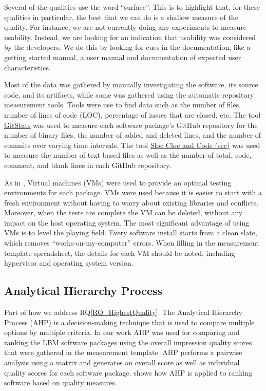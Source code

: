 \documentclass[final, 3p, times, authoryear]{elsarticle}
\newcommand{\rqref}[1]{RQ\ref{#1}}
\begin{document}
Several of the qualities use the word ``surface''.  This is to highlight that,
for these qualities in particular, the best that we can do is a shallow measure
of the quality.  For instance, we are not currently doing any experiments to
measure usability.  Instead, we are looking for an indication that usability was
considered by the developers.  We do this by looking for cues in the
documentation, like a getting started manual, a user manual and documentation of
expected user characteristics.

Most of the data was gathered by manually investigating the software, its source
code, and its artifacts, while some was gathered using the automatic repository
measurement tools.  Tools were use to find data such as the number of files,
number of lines of code (LOC), percentage of issues that are closed, etc. The
tool \href{https://github.com/tomgi/git_stats}{GitStats} was used to measure
each software package's GitHub repository for the number of binary files, the
number of added and deleted lines, and the number of commits over varying time
intervals. The tool \href{https://github.com/boyter/scc}{Sloc Cloc and Code
(scc)} was used to measure the number of text based files as well as the number
of total, code, comment, and blank lines in each GitHub repository.

As in \citet{SmithEtAl2016}, Virtual machines (VMs) were used to provide an
optimal testing environments for each package. VMs were used because it is
easier to start with a fresh environment without having to worry about existing
libraries and conflicts. Moreover, when the tests are complete the VM can be
deleted, without any impact on the host operating system. The most significant
advantage of using VMs is to level the playing field. Every software install
starts from a clean slate, which removes ``works-on-my-computer'' errors. When
filling in the measurement template spreadsheet, the details for each VM
should be noted, including hypervisor and operating system version.

\subsection{Analytical Hierarchy Process} \label{AHP}

Part of how we address \rqref{RQ_HighestQuality}.  The Analytical Hierarchy
Process (AHP) is a decision-making technique that is used to compare multiple
options by multiple criteria. In our work AHP was used for comparing and ranking
the LBM software packages using the overall impression quality scores that were
gathered in the measurement template.  AHP performs a pairwise analysis using a
matrix and generates an overall score as well as individual quality scores for
each software package. \citep{SmithEtAl2016} shows how AHP is applied to ranking
software based on quality measures. 
\end{document}
